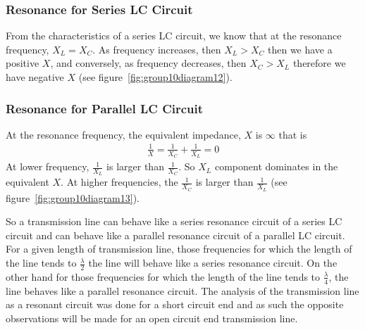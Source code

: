 \subsubsection{Resonance for Series LC Circuit}
From the characteristics of a series LC circuit, we know that at the resonance frequency, $X_L = X_C$. As frequency increases, then $ X_{L} > X_{C} $ then we have a positive $X$, and conversely, as frequency decreases, then $ X_{C} > X_{L} $ therefore we have negative $X$ (see figure~\ref{fig:group10diagram12}).

\subsubsection{Resonance for Parallel LC Circuit}
At the resonance frequency, the equivalent impedance, $X$ is $\infty$ that is
\begin{align*}
\frac{1}{X} = \frac{1}{X_{C}} + \frac{1}{X_{L}} = 0
\end{align*}
At lower frequency, $ \frac{1}{X_{L}} $ is larger than $ \frac{1}{X_{C}} $. So $ X_{L} $ component dominates in the equivalent $X$. At higher frequencies, the $\frac{1}{X_C}$ is larger than $\frac{1}{X_L}$ (see figure~\ref{fig:group10diagram13}).

So a transmission line can behave like a series resonance circuit of a series LC circuit and can behave like a parallel resonance circuit of a parallel LC circuit. For a given length of transmission line, those frequencies for which the length of the line tends to $ \frac{\lambda}{2} $ the line will behave like a series resonance circuit. On the other hand for those frequencies for which the length of the line tends to $ \frac{\lambda}{4} $, the line behaves like a parallel resonance circuit. The analysis of the transmission line as a resonant circuit was done for a short circuit end and as such the opposite observations will be made for an open circuit end transmission line.

